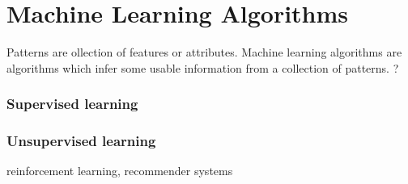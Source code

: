 \section{Machine Learning Algorithms}
\begin{slide}
	Patterns are ollection of features or attributes. Machine learning algorithms are algorithms which infer some usable information from a collection of patterns. ?
	\begin{multicols}{2}
		\subsubsection*{Supervised learning}
			

		\subsubsection*{Unsupervised learning}
	\end{multicols}
	reinforcement learning, recommender systems
\end{slide}
